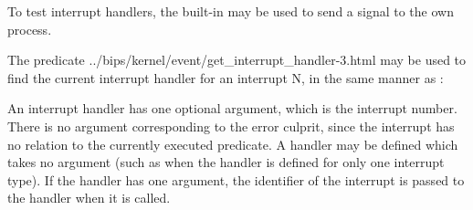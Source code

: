 To test interrupt handlers, the built-in
 may be used to send
a signal to the own process.

The predicate
%
{../bips/kernel/event/get_interrupt_handler-3.html}
may be used to find the
current interrupt handler for an interrupt N, in the same manner as
:
\begin{quote}
%
\end{quote}

An interrupt handler has one optional argument, which is the interrupt
number.
There is no argument corresponding to the error culprit, since
the interrupt has no relation to the currently executed predicate.
A handler may be defined which takes no argument (such
as when the handler is defined for only one interrupt type).
If the handler has one argument, the identifier of the interrupt is passed
to the handler when it is called.


